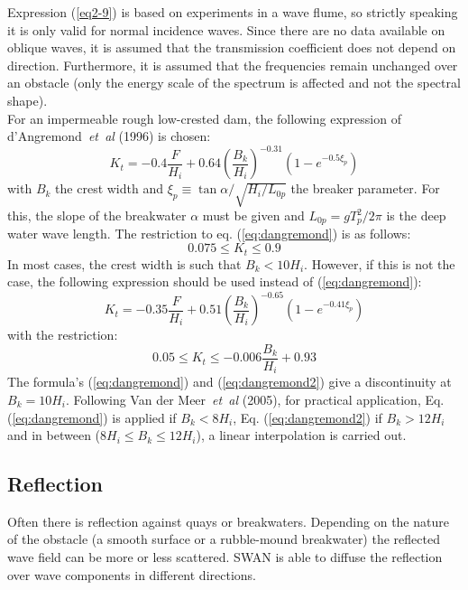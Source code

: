 \documentclass[12pt]{book}
\begin{document}
Expression (\ref{eq2-9}) is based on experiments in a wave flume, so strictly speaking it is only valid for
normal incidence waves. Since there are no data available on oblique waves, it is assumed that the
transmission coefficient does not depend on direction. Furthermore, it is assumed that the frequencies remain
unchanged over an obstacle (only the energy scale of the spectrum is affected and not the spectral shape).
\\[2ex]
\noindent
For an impermeable rough low-crested dam, the following expression of d'Angremond~{\it et~al} (1996) is chosen:
\begin{equation}
  K_t = -0.4 \frac{F}{H_i} + 0.64 (\frac{B_k}{H_i})^{-0.31} (1 - e^{-0.5{\xi}_p})
  \label{eq:dangremond}
\end{equation}
with $B_k$ the crest width and ${\xi}_p \equiv \tan \alpha/\sqrt{H_i/L_{0p}}$ the breaker parameter. For this,
the slope of the breakwater $\alpha$ must be given and $L_{0p} = g T_p^2/ 2\pi$ is the deep water wave length.
The restriction to eq. (\ref{eq:dangremond}) is as follows:
\begin{equation}
  0.075 \leq K_t \leq 0.9
\end{equation}
In most cases, the crest width is such that $B_k < 10 H_i$. However, if this is not the case, the following expression
should be used instead of (\ref{eq:dangremond}):
\begin{equation}
  K_t = -0.35 \frac{F}{H_i} + 0.51 (\frac{B_k}{H_i})^{-0.65} (1 - e^{-0.41{\xi}_p})
  \label{eq:dangremond2}
\end{equation}
with the restriction:
\begin{equation}
  0.05 \leq K_t \leq -0.006\frac{B_k}{H_i} + 0.93
\end{equation}
The formula's (\ref{eq:dangremond}) and (\ref{eq:dangremond2}) give a discontinuity at $B_k = 10 H_i$. Following
Van der Meer~{\it et~al} (2005), for practical
application, Eq. (\ref{eq:dangremond}) is applied if $B_k < 8 H_i$, Eq. (\ref{eq:dangremond2}) if $B_k > 12 H_i$ and
in between ($8 H_i \leq B_k \leq 12 H_i$), a linear interpolation is carried out.
\nocite{God67TM,See79,Dan96MJ,Mee05BZW}

\subsection{Reflection}

Often there is reflection against quays or breakwaters.
Depending on the nature of the obstacle (a smooth surface or a rubble-mound breakwater)
the reflected wave field can be more or less scattered.
SWAN is able to diffuse the reflection over wave components in different directions.
\end{document}
